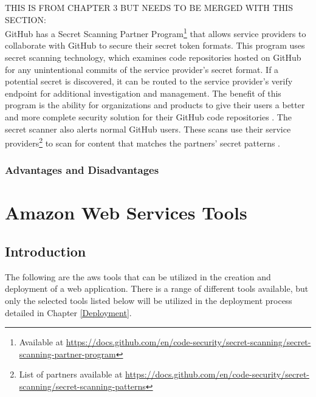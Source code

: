 \begin{itemize}
THIS IS FROM CHAPTER 3 BUT NEEDS TO BE MERGED WITH THIS SECTION:\\
GitHub has a Secret Scanning Partner Program\footnote{{Available at \url{https://docs.github.com/en/code-security/secret-scanning/secret-scanning-partner-program}}} that allows service providers to collaborate with GitHub to secure their secret token formats. This program uses secret scanning technology, which examines code repositories hosted on GitHub for any unintentional commits of the service provider's secret format. If a potential secret is discovered, it can be routed to the service provider's verify endpoint for additional investigation and management. The benefit of this program is the ability for organizations and products to give their users a better and more complete security solution for their GitHub code repositories \cite{partnerprogram}. The secret scanner also alerts normal GitHub users. These scans use their service providers\footnote{List of partners available at \url{https://docs.github.com/en/code-security/secret-scanning/secret-scanning-patterns}} to scan for content that matches the partners' secret patterns \cite{GitHubSecretScannerUserAlert}.
\end{itemize}
\subsubsection{Advantages and Disadvantages}


\section{Amazon Web Services Tools}
\subsection{Introduction}
The following are the \acrshort{aws} tools that can be utilized in the creation and deployment of a web application. There is a range of different tools available, but only the selected tools listed below will be utilized in the deployment process detailed in Chapter \ref{Deployment}.

